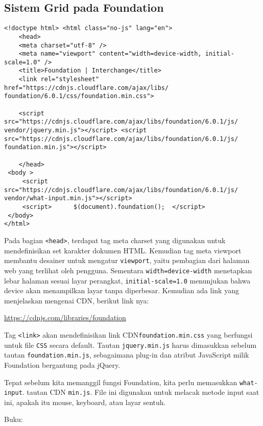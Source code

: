 \begin{enumerate}
\subsection{Sistem Grid pada Foundation}
\label{subs:grid_zurb}
\begin{lstlisting}[breaklines,breakatwhitespace, frame=single, basicstyle=\small] 
<!doctype html> <html class="no-js" lang="en">  
	<head>    
	<meta charset="utf-8" />    
	<meta name="viewport" content="width=device-width, initial-scale=1.0" />    
	<title>Foundation | Interchange</title> 
	<link rel="stylesheet" href="https://cdnjs.cloudflare.com/ajax/libs/ foundation/6.0.1/css/foundation.min.css">
	 
	<script src="https://cdnjs.cloudflare.com/ajax/libs/foundation/6.0.1/js/ vendor/jquery.min.js"></script> <script src="https://cdnjs.cloudflare.com/ajax/libs/foundation/6.0.1/js/ foundation.min.js"></script>
	 
	</head> 
 <body >  
	 <script src="https://cdnjs.cloudflare.com/ajax/libs/foundation/6.0.1/js/ vendor/what-input.min.js"></script> 
	 <script>      $(document).foundation();  </script>     
 </body> 
</html>
\end{lstlisting}

Pada bagian \verb|<head>|, terdapat tag meta charset yang digunakan untuk mendefinisikan set karakter dokumen HTML. Kemudian tag meta viewport membantu desainer untuk mengatur \texttt{viewport}, yaitu pembagian dari halaman web yang terlihat oleh pengguna. Sementara \texttt{width=device-width} menetapkan lebar halaman sesuai layar perangkat, \texttt{initial-scale=1.0} menunjukan bahwa device akan menampilkan layar tanpa diperbesar. Kemudian ada link yang menjelaskan mengenai CDN, berikut link nya:

\url{https://cdnjs.com/libraries/foundation}

Tag \texttt{<link>} akan mendefinisikan link CDN\texttt{foundation.min.css} yang berfungsi untuk file \texttt{CSS} secara default. Tautan \texttt{jquery.min.js} harus dimasukkan sebelum
tautan \texttt{foundation.min.js}, sebagaimana plug-in dan atribut JavaScript milik Foundation
bergantung pada jQuery.

Tepat sebelum kita memanggil fungsi Foundation, kita perlu memasukkan \texttt{what-input}.
tautan CDN \texttt{min.js}. File ini digunakan untuk melacak metode input saat ini, apakah itu 
mouse, keyboard, atau layar sentuh. ~\cite{zurb:15:introfoundation}

Buku:~\cite{berg:08:compgeom} 



\end{enumerate}
